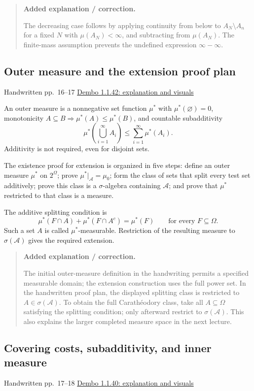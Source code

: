 \documentclass[11pt,letterpaper]{article}
\newcommand{\lecturesection}[1]{\subsection{#1}}
\begin{document}
\begin{quote}\small\textbf{Added explanation / correction.}

The decreasing case follows by applying continuity from below to $A_N\setminus A_n$ for a fixed $N$ with $\mu(A_N)<\infty$, and subtracting from $\mu(A_N)$. The finite-mass assumption prevents the undefined expression $\infty-\infty$.
\end{quote}

\hypertarget{l2-s7}{}
\lecturesection{Outer measure and the extension proof plan}
{\small\textcolor{lectureink}{Handwritten pp.\ 16--17} \quad \href{https://josephrbailey.com/probability/\#entry-1-1-42}{Dembo 1.1.42: explanation and visuals}}

An outer measure is a nonnegative set function $\mu^*$ with $\mu^*(\varnothing)=0$, monotonicity $A\subseteq B\Rightarrow\mu^*(A)\le\mu^*(B)$, and countable subadditivity \[\mu^*\!\left(\bigcup_{i=1}^{\infty}A_i\right)\le\sum_{i=1}^{\infty}\mu^*(A_i).\] Additivity is not required, even for disjoint sets.

The existence proof for extension is organized in five steps: define an outer measure $\mu^*$ on $2^\Omega$; prove $\mu^*|_{\mathcal A}=\mu_0$; form the class of sets that split every test set additively; prove this class is a $\sigma$-algebra containing $\mathcal A$; and prove that $\mu^*$ restricted to that class is a measure.

The additive splitting condition is \[\mu^*(F\cap A)+\mu^*(F\cap A^c)=\mu^*(F)\qquad\text{for every }F\subseteq\Omega.\] Such a set $A$ is called $\mu^*$-measurable. Restriction of the resulting measure to $\sigma(\mathcal A)$ gives the required extension.

\begin{quote}\small\textbf{Added explanation / correction.}

The initial outer-measure definition in the handwriting permits a specified measurable domain; the extension construction uses the full power set. In the handwritten proof plan, the displayed splitting class is restricted to $A\in\sigma(\mathcal A)$. To obtain the full Carathéodory class, take all $A\subseteq\Omega$ satisfying the splitting condition; only afterward restrict to $\sigma(\mathcal A)$. This also explains the larger completed measure space in the next lecture.
\end{quote}

\hypertarget{l2-s8}{}
\lecturesection{Covering costs, subadditivity, and inner measure}
{\small\textcolor{lectureink}{Handwritten pp.\ 17--18} \quad \href{https://josephrbailey.com/probability/\#entry-1-1-40}{Dembo 1.1.40: explanation and visuals}}
\end{document}
